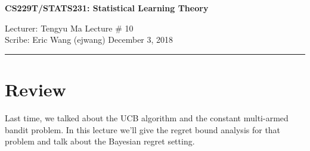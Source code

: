 \documentclass[11pt]{article}
\newcommand{\draftnotice}{\vbox to 0.25in{\noindent
   \raisebox{0.6in}[0in][0in]{\makebox[\textwidth][r]{\it
    DRAFT --- a final version will be posted shortly}}}
   \vspace{-.25in}\vspace{-\baselineskip}
}
\begin{document}
\thispagestyle{empty}


\begin{center}
\bf\large CS229T/STATS231: Statistical Learning Theory
\end{center}

\noindent
Lecturer: Tengyu Ma   %
\hfill
Lecture \# 10           %
\\
Scribe: Eric Wang (ejwang)               %
\hfill
December 3, 2018           %

\noindent
\rule{\textwidth}{1pt}

\medskip


\section{Review}
Last time, we talked about the UCB algorithm
and the constant multi-armed bandit problem.
In this lecture we'll give the regret bound analysis for that problem
and talk about the Bayesian regret setting.
\end{document}
